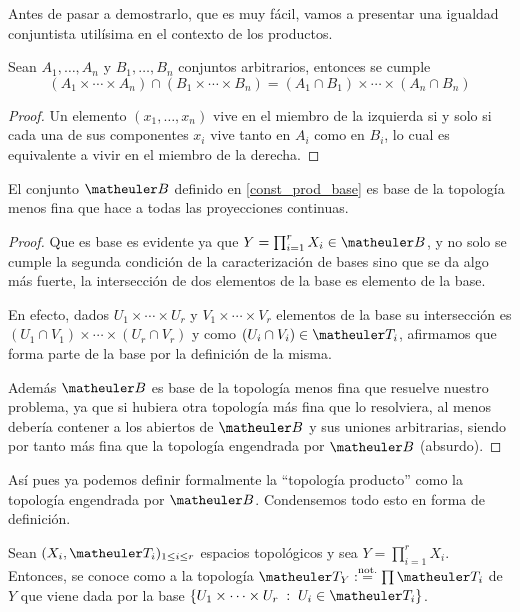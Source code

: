 Antes de pasar a demostrarlo, que es muy fácil, vamos a presentar una igualdad conjuntista utilísima en el contexto de los productos.
\begin{lem}
	\label{const_lem_cartesiano}
	Sean $A_1,\dots,A_n$ y $B_1,\dots,B_n$ conjuntos arbitrarios, entonces se cumple
	\begin{equation*}
		(A_1\times\cdots\times A_n)\cap(B_1\times\cdots\times B_n)=(A_1\cap B_1)\times\cdots\times (A_n\cap B_n)
	\end{equation*}
\end{lem}
\begin{proof}
	Un elemento $(x_1,\dots,x_n)$ vive en el miembro de la izquierda si y solo si cada una de sus componentes $x_i$ vive tanto en $A_i$ como en $B_i$, lo cual es equivalente a vivir en el miembro de la derecha. 
\end{proof}
\begin{prop}
	El conjunto $\B$ definido en \ref{const_prod_base} es base de la topología menos fina que hace a todas las proyecciones continuas.
\end{prop}
\begin{proof}
	Que es base es evidente ya que $Y=\prod_{i=1}^{r}X_i\in\B$, y no solo se cumple la segunda condición de la caracterización de bases sino que se da algo más fuerte, la intersección de dos elementos de la base es elemento de la base.
	
	En efecto, dados $U_1\times\cdots\times U_r$ y $V_1\times\cdots\times V_r$ elementos de la base su intersección es $(U_1\cap V_1)\times\cdots\times (U_r\cap V_r)$ y como $(U_i\cap V_i)\in \T_i$, afirmamos que forma parte de la base por la definición de la misma.
	
	Además $\B$ es base de la topología menos fina que resuelve nuestro problema, ya que si hubiera otra topología más fina que lo resolviera, al menos debería contener a los abiertos de $\B$ y sus uniones arbitrarias, siendo por tanto más fina que la topología engendrada por $\B$ (absurdo).
\end{proof}

Así pues ya podemos definir formalmente la ``topología producto'' como la topología engendrada por $\B$. Condensemos todo esto en forma de definición.
\begin{defi}
	Sean $(X_{i},\T_{i})_{1\le i\le r}$ espacios topológicos y sea $Y=\prod_{i=1}^r X_i$. Entonces, se conoce como  a la topología $\T_Y:\stackrel{\textrm{not.}}{=}\prod\T_i$ de $Y$ que viene dada por la base $ \{ U_1\times\cdots\times U_r \midc U_i\in \T_i \}$.
\end{defi}
